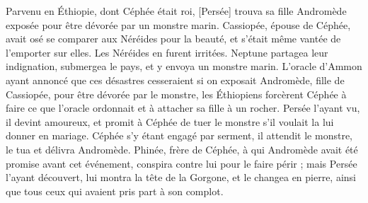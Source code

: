{{Parvenu en Éthiopie, dont Céphée était roi, [Persée] trouva sa fille Andromède exposée pour être dévorée par un monstre marin. Cassiopée, épouse de Céphée, avait osé se comparer aux Néréides pour la beauté, et s'était même vantée de l'emporter sur elles. Les Néréides en furent irritées. Neptune partagea leur indignation, submergea le pays, et y envoya un monstre marin. L'oracle d'Ammon ayant annoncé que ces désastres cesseraient si on exposait Andromède, fille de Cassiopée, pour être dévorée par le monstre, les Éthiopiens forcèrent Céphée à faire ce que l'oracle ordonnait et à attacher sa fille à un rocher. Persée l'ayant vu, il devint amoureux, et promit à Céphée de tuer le monstre s'il voulait la lui donner en mariage. Céphée s'y étant engagé par serment, il attendit le monstre, le tua et délivra Andromède. Phinée, frère de Céphée, à qui Andromède avait été promise avant cet événement, conspira contre lui pour le faire périr ; mais Persée l'ayant découvert, lui montra la tête de la Gorgone, et le changea en pierre, ainsi que tous ceux qui avaient pris part à son complot.}}
